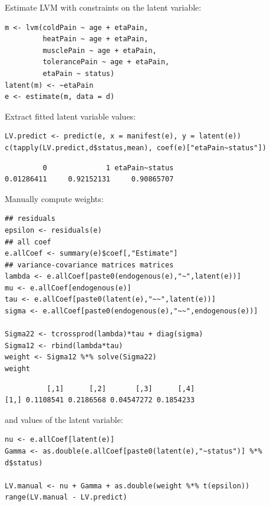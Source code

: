 \documentclass{article}
\begin{document}
Estimate LVM with constraints on the latent variable:
\lstset{language=r,label= ,caption= ,captionpos=b,numbers=none}
\begin{lstlisting}
m <- lvm(coldPain ~ age + etaPain,
         heatPain ~ age + etaPain,
         musclePain ~ age + etaPain,
         tolerancePain ~ age + etaPain,
         etaPain ~ status)
latent(m) <- ~etaPain
e <- estimate(m, data = d)
\end{lstlisting}

Extract fitted latent variable values:
\lstset{language=r,label= ,caption= ,captionpos=b,numbers=none}
\begin{lstlisting}
LV.predict <- predict(e, x = manifest(e), y = latent(e))
c(tapply(LV.predict,d$status,mean), coef(e)["etaPain~status"])
\end{lstlisting}

\begin{verbatim}
         0              1 etaPain~status 
0.01286411     0.92152131     0.90865707
\end{verbatim}


\clearpage

Manually compute weights: 
\lstset{language=r,label= ,caption= ,captionpos=b,numbers=none}
\begin{lstlisting}
## residuals
epsilon <- residuals(e) 
## all coef
e.allCoef <- summary(e)$coef[,"Estimate"]
## variance-covariance matrices matrices
lambda <- e.allCoef[paste0(endogenous(e),"~",latent(e))]
mu <- e.allCoef[endogenous(e)]
tau <- e.allCoef[paste0(latent(e),"~~",latent(e))]
sigma <- e.allCoef[paste0(endogenous(e),"~~",endogenous(e))]

Sigma22 <- tcrossprod(lambda)*tau + diag(sigma)
Sigma12 <- rbind(lambda*tau)
weight <- Sigma12 %*% solve(Sigma22)
weight
\end{lstlisting}

\begin{verbatim}
          [,1]      [,2]       [,3]      [,4]
[1,] 0.1108541 0.2186568 0.04547272 0.1854233
\end{verbatim}


and values of the latent variable:
\lstset{language=r,label= ,caption= ,captionpos=b,numbers=none}
\begin{lstlisting}
nu <- e.allCoef[latent(e)]
Gamma <- as.double(e.allCoef[paste0(latent(e),"~status")] %*% d$status)

LV.manual <- nu + Gamma + as.double(weight %*% t(epsilon))
range(LV.manual - LV.predict)
\end{lstlisting}
\end{document}
